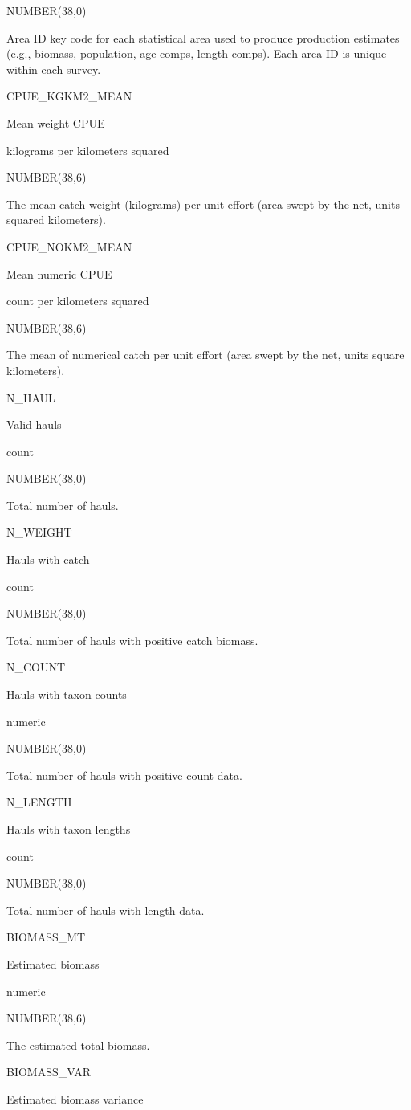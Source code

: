 \documentclass[
  letterpaper,
  oneside,
  open=any]{scrbook}
\begin{document}
NUMBER(38,0)

Area ID key code for each statistical area used to produce production
estimates (e.g., biomass, population, age comps, length comps). Each
area ID is unique within each survey.

CPUE\_KGKM2\_MEAN

Mean weight CPUE

kilograms per kilometers squared

NUMBER(38,6)

The mean catch weight (kilograms) per unit effort (area swept by the
net, units squared kilometers).

CPUE\_NOKM2\_MEAN

Mean numeric CPUE

count per kilometers squared

NUMBER(38,6)

The mean of numerical catch per unit effort (area swept by the net,
units square kilometers).

N\_HAUL

Valid hauls

count

NUMBER(38,0)

Total number of hauls.

N\_WEIGHT

Hauls with catch

count

NUMBER(38,0)

Total number of hauls with positive catch biomass.

N\_COUNT

Hauls with taxon counts

numeric

NUMBER(38,0)

Total number of hauls with positive count data.

N\_LENGTH

Hauls with taxon lengths

count

NUMBER(38,0)

Total number of hauls with length data.

BIOMASS\_MT

Estimated biomass

numeric

NUMBER(38,6)

The estimated total biomass.

BIOMASS\_VAR

Estimated biomass variance
\end{document}
